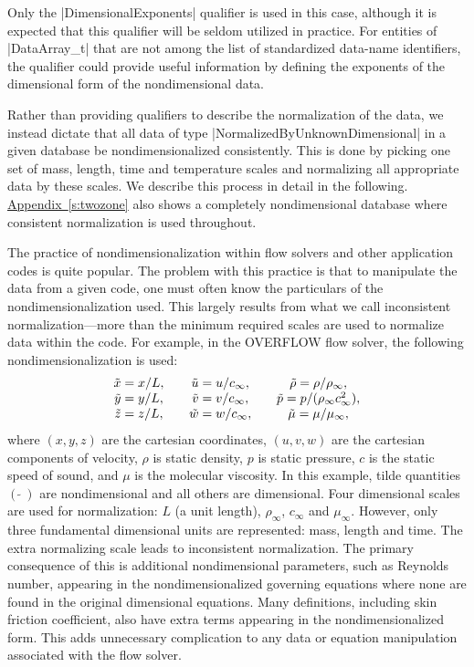 Only the |DimensionalExponents| qualifier is used in this case,
although it is expected that this qualifier will be seldom utilized in
practice.  For entities of |DataArray_t| that are not among the list of
standardized data-name identifiers, the qualifier could provide useful
information by defining the exponents of the dimensional form of the
nondimensional data.

Rather than providing qualifiers to describe the normalization of the data,
we instead dictate that all data of type |NormalizedByUnknownDimensional|
in a given database be nondimensionalized consistently.  This is done by
picking one set of mass, length, time and temperature scales and normalizing
all appropriate data by these scales.  We describe this process in detail in
the following.  \hyperref[s:twozone]{Appendix~\ref*{s:twozone}} also shows
a completely nondimensional database where consistent normalization is used
throughout.

The practice of nondimensionalization within flow solvers and other
application codes is quite popular.  The problem with this practice
is that to manipulate the data from a given code, one must often know
the particulars of the nondimensionalization used.  This largely
results from what we call inconsistent normalization---more than
the minimum required scales are used to normalize data within the
code.  For example, in the OVERFLOW flow solver, the following
nondimensionalization is used:
$$
\begin{array}{c@{\qquad}c@{\qquad}c}
 \tilde{x} = x/L, & \tilde{u} = u/c_\infty, & \tilde{\rho} = \rho/\rho_\infty, \\ 
 \tilde{y} = y/L, & \tilde{v} = v/c_\infty, & \tilde{p} = p/(\rho_\infty c_\infty^2), \\
 \tilde{z} = z/L, & \tilde{w} = w/c_\infty, & \tilde{\mu} = \mu/\mu_\infty,
\end{array}
$$
where $(x,y,z)$ are the cartesian coordinates, $(u,v,w)$ are the
cartesian components of velocity, $\rho$ is static density, $p$ is
static pressure, $c$ is the static speed of sound, and $\mu$ is the
molecular viscosity.
In this example, tilde quantities $(\:\tilde{}\:)$ are nondimensional
and all others are dimensional.
Four dimensional scales are used for normalization: $L$ (a unit length),
$\rho_\infty$, $c_\infty$ and $\mu_\infty$.
However, only three fundamental dimensional units are represented: mass,
length and time.  The extra normalizing scale leads to inconsistent
normalization.  The primary consequence of this is additional
nondimensional parameters, such as Reynolds number, appearing in
the nondimensionalized governing equations where none are found in
the original dimensional equations.  Many definitions, including
skin friction coefficient, also have extra terms appearing in the
nondimensionalized form.  This adds unnecessary complication to any data
or equation manipulation associated with the flow solver.


